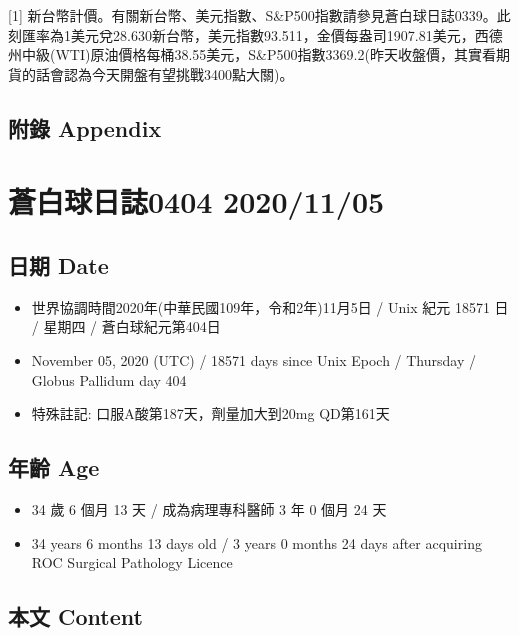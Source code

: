 \documentclass[
]{article}
\providecommand{\tightlist}{%
  \setlength{\itemsep}{0pt}\setlength{\parskip}{0pt}}
\begin{document}
{[}1{]}
新台幣計價。有關新台幣、美元指數、S\&P500指數請參見蒼白球日誌0339。此刻匯率為1美元兌28.630新台幣，美元指數93.511，金價每盎司1907.81美元，西德州中級(WTI)原油價格每桶38.55美元，S\&P500指數3369.2(昨天收盤價，其實看期貨的話會認為今天開盤有望挑戰3400點大關)。

\hypertarget{ux9644ux9304-appendix-61}{%
\subsection{附錄 Appendix}\label{ux9644ux9304-appendix-61}}

\hypertarget{ux84bcux767dux7403ux65e5ux8a8c0404-20201105}{%
\section{蒼白球日誌0404
2020/11/05}\label{ux84bcux767dux7403ux65e5ux8a8c0404-20201105}}

\hypertarget{ux65e5ux671f-date-62}{%
\subsection{日期 Date}\label{ux65e5ux671f-date-62}}

\begin{itemize}
\tightlist
\item
  世界協調時間2020年(中華民國109年，令和2年)11月5日 / Unix 紀元 18571 日
  / 星期四 / 蒼白球紀元第404日
\item
  November 05, 2020 (UTC) / 18571 days since Unix Epoch / Thursday /
  Globus Pallidum day 404
\item
  特殊註記: 口服A酸第187天，劑量加大到20mg QD第161天
\end{itemize}

\hypertarget{ux5e74ux9f61-age-62}{%
\subsection{年齡 Age}\label{ux5e74ux9f61-age-62}}

\begin{itemize}
\tightlist
\item
  34 歲 6 個月 13 天 / 成為病理專科醫師 3 年 0 個月 24 天
\item
  34 years 6 months 13 days old / 3 years 0 months 24 days after
  acquiring ROC Surgical Pathology Licence
\end{itemize}

\hypertarget{ux672cux6587-content-62}{%
\subsection{本文 Content}\label{ux672cux6587-content-62}}
\end{document}
